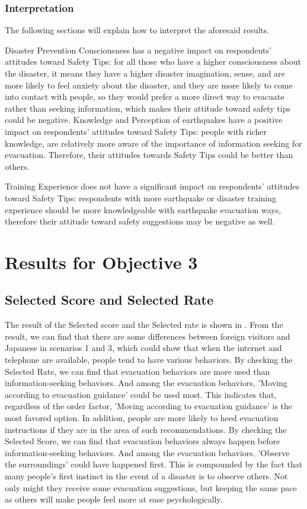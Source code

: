 \subsubsection{Interpretation}
The following sections will explain how to interpret the aforesaid results. 

Disaster Prevention Consciousness has a negative impact on respondents' attitudes toward Safety Tips: for all those who have a higher consciousness about the disaster, it means they have a higher disaster imagination, sense, and are more likely to feel anxiety about the disaster, and they are more likely to come into contact with people, so they would prefer a more direct way to evacuate rather than seeking information, which makes their attitude toward safety tips could be negative.
Knowledge and Perception of earthquakes have a positive impact on respondents' attitudes toward Safety Tips: people with richer knowledge, are relatively more aware of the importance of information seeking for evacuation. Therefore, their attitudes towards Safety Tips could be better than others.

Training Experience does not have a significant impact on respondents' attitudes toward Safety Tips: respondents with more earthquake or disaster training experience should be more knowledgeable with earthquake evacuation ways, therefore their attitude toward safety suggestions may be negative as well. 




\section{Results for Objective 3}

\subsection{Selected Score and Selected Rate}
The result of the Selected score and the Selected rate is shown in . From the result, we can find that there are some differences between foreign visitors and Japanese in scenarios 1 and 3, which could show that when the internet and telephone are available, people tend to have various behaviors. By checking the Selected Rate, we can find that evacuation behaviors are more used than information-seeking behaviors. And among the evacuation behaviors, 'Moving according to evacuation guidance' could be used most. This indicates that, regardless of the order factor, 'Moving according to evacuation guidance' is the most favored option. In addition, people are more likely to heed evacuation instructions if they are in the area of such recommendations.  By checking the Selected Score, we can find that evacuation behaviors always happen before information-seeking behaviors. And among the evacuation behaviors, 'Observe the surroundings' could have happened first. This is compounded by the fact that many people's first instinct in the event of a disaster is to observe others. Not only might they receive some evacuation suggestions, but keeping the same pace as others will make people feel more at ease psychologically. 

